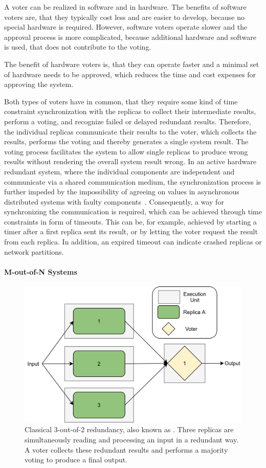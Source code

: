 A voter can be realized in software and in hardware.
The benefits of software voters are, that they typically cost less and are easier to develop, because no special hardware is required.
However, software voters operate slower and the approval process is more complicated, because additional hardware and software is used, that does not contribute to the voting.

The benefit of hardware voters is, that they can operate faster and a minimal set of hardware needs to be approved, which reduces the time and cost expenses for approving the system.

Both types of voters have in common, that they require some kind of time constraint synchronization with the replicas to collect their intermediate results, perform a voting, and recognize failed or delayed redundant results.
Therefore, the individual replicas communicate their results to the voter, which collects the results, performs the voting and thereby generates a single system result.
The voting process facilitates the system to allow single replicas to produce wrong results without rendering the overall system result wrong.
In an active hardware redundant system, where the individual components are independent and communicate via a shared communication medium, the synchronization process is further impeded by the impossibility of agreeing on values in asynchronous distributed systems with faulty components~\cite{FLPProblemConsensus}.
Consequently, a way for synchronizing the communication is required, which can be achieved through time constraints in form of timeouts.
This can be, for example, achieved by starting a timer after a first replica sent its result, or by letting the voter request the result from each replica.
In addition, an expired timeout can indicate crashed replicas or network partitions.

\paragraph{M-out-of-N Systems}
\begin{figure}[!hb]
	\centering
	\includegraphics[width=0.75\linewidth]{images/Classical2OO3}
	\caption{Classical 3-out-of-2 redundancy, also known as . Three replicas are simultaneously reading and processing an input in a redundant way. A voter collects these redundant results and performs a majority voting to produce a final output.}
	\label{fig:Classical2OO3}
\end{figure}

